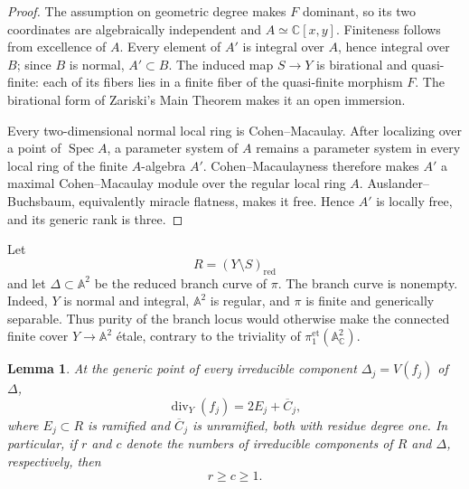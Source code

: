 \documentclass[11pt]{article}
\newtheorem{lemma}[theorem]{Lemma}
\theoremstyle{definition}
\theoremstyle{remark}
\newcommand{\A}{\mathbb A}
\newcommand{\C}{\mathbb C}
\newcommand{\Spec}{\operatorname{Spec}}
\newcommand{\divisor}{\operatorname{div}}
\begin{document}
\begin{proof}
The assumption on geometric degree makes \(F\) dominant, so its two
coordinates are algebraically independent and
\(A\simeq\C[x,y]\).  Finiteness follows from excellence of \(A\).
Every element of \(A'\)
is integral over \(A\), hence integral over \(B\); since \(B\) is
normal, \(A'\subset B\).  The induced map \(S\to Y\) is birational and
quasi-finite: each of its fibers lies in a finite fiber of the
quasi-finite morphism \(F\).  The birational form of Zariski's Main
Theorem makes it an open immersion.

Every two-dimensional normal local ring is Cohen--Macaulay.  After
localizing over a point of \(\Spec A\), a parameter system of \(A\)
remains a parameter system in every local ring of the finite
\(A\)-algebra \(A'\).  Cohen--Macaulayness therefore makes \(A'\) a
maximal Cohen--Macaulay module over the regular local ring \(A\).
Auslander--Buchsbaum, equivalently miracle flatness, makes it free.
Hence \(A'\) is locally free, and its generic rank is three.
\end{proof}

Let
\[
 R=(Y\setminus S)_{\mathrm{red}}
\]
and let \(\Delta\subset\A^2\) be the reduced branch curve of \(\pi\).
The branch curve is nonempty.  Indeed, \(Y\) is normal and integral,
\(\A^2\) is regular, and \(\pi\) is finite and generically separable.
Thus purity of the branch locus would otherwise make the connected
finite cover \(Y\to\A^2\) \'etale, contrary to the triviality of
\(\pi_1^{\mathrm{et}}(\A^2_\C)\).

\begin{lemma}\label{lem:branch-type}
At the generic point of every irreducible component
\(\Delta_j=V(f_j)\) of \(\Delta\),
\[
 \divisor_Y(f_j)=2E_j+\overline C_j,
 \tag{2.1}
\]
where \(E_j\subset R\) is ramified and
\(\overline C_j\) is unramified, both with residue degree one.  In
particular, if \(r\) and \(c\) denote the numbers of irreducible
components of \(R\) and \(\Delta\), respectively, then
\[
 r\ge c\ge1.
 \tag{2.2}
\]
\end{lemma}
\end{document}
